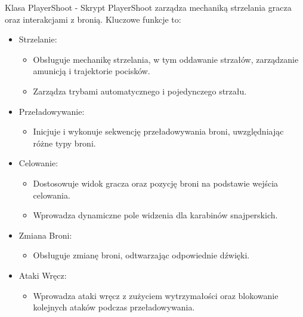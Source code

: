 Klasa PlayerShoot -
Skrypt PlayerShoot zarządza mechaniką strzelania gracza oraz interakcjami z bronią. Kluczowe funkcje to:
\begin{itemize}
  \item Strzelanie:
    \begin{itemize}
      \item Obsługuje mechanikę strzelania, w tym oddawanie strzałów, zarządzanie amunicją i trajektorie pocisków.
      \item Zarządza trybami automatycznego i pojedynczego strzału.
    \end{itemize}
  \item Przeładowywanie:
    \begin{itemize}
      \item Inicjuje i wykonuje sekwencję przeładowywania broni, uwzględniając różne typy broni.
    \end{itemize}
  \item Celowanie:
    \begin{itemize}
      \item Dostosowuje widok gracza oraz pozycję broni na podstawie wejścia celowania.
      \item Wprowadza dynamiczne pole widzenia dla karabinów snajperskich.
    \end{itemize}
  \item Zmiana Broni:
    \begin{itemize}
      \item Obsługuje zmianę broni, odtwarzając odpowiednie dźwięki.
    \end{itemize}
  \item Ataki Wręcz:
    \begin{itemize}
      \item Wprowadza ataki wręcz z zużyciem wytrzymałości oraz blokowanie kolejnych ataków podczas przeładowywania.
    \end{itemize}
\end{itemize}

